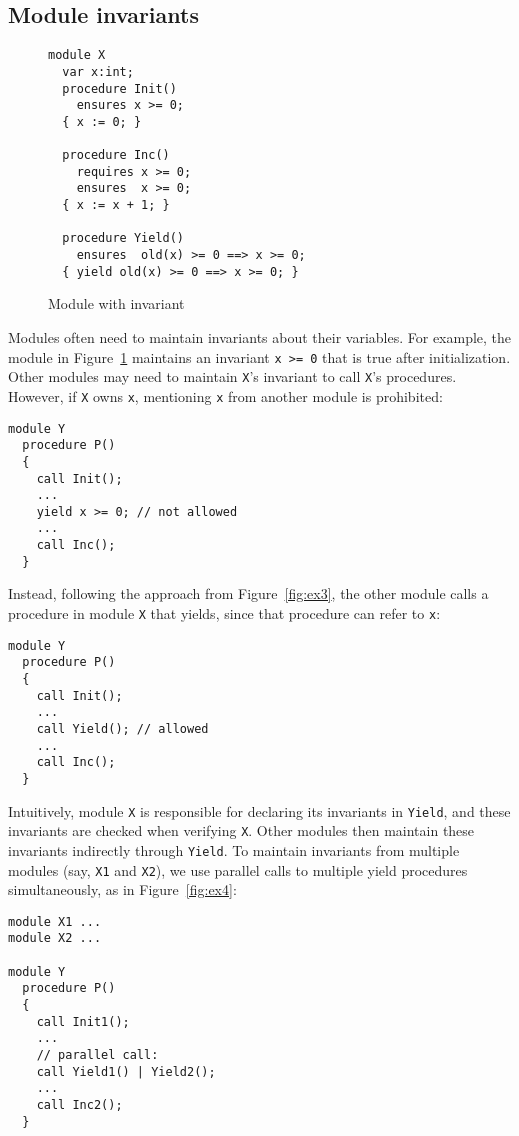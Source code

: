 \subsection{Module invariants}

\begin{figure}
\begin{verbatim}
module X
  var x:int;
  procedure Init()
    ensures x >= 0;
  { x := 0; }

  procedure Inc()
    requires x >= 0;
    ensures  x >= 0;
  { x := x + 1; }

  procedure Yield()
    ensures  old(x) >= 0 ==> x >= 0;
  { yield old(x) >= 0 ==> x >= 0; }
\end{verbatim}
\caption{Module with invariant}
\label{fig:moduleInvariant}
\end{figure}

Modules often need to maintain invariants about their variables.
For example, the module in Figure~\ref{fig:moduleInvariant} maintains an invariant \verb`x >= 0`
that is true after initialization.
Other modules may need to maintain \verb`X`'s invariant to call \verb`X`'s procedures.
However, if \verb`X` owns \verb`x`, mentioning \verb`x` from another module is prohibited:

\begin{verbatim}
module Y
  procedure P()
  {
    call Init();
    ...
    yield x >= 0; // not allowed
    ...
    call Inc();
  }
\end{verbatim}

\noindent
Instead, following the approach from Figure~\ref{fig:ex3},
the other module calls a procedure in module \verb`X` that yields,
since that procedure can refer to \verb`x`:

\begin{verbatim}
module Y
  procedure P()
  {
    call Init();
    ...
    call Yield(); // allowed
    ...
    call Inc();
  }
\end{verbatim}

\noindent
Intuitively, module \verb`X` is responsible for declaring its invariants in \verb`Yield`,
and these invariants are checked when verifying \verb`X`.
Other modules then maintain these invariants indirectly through \verb`Yield`.
To maintain invariants from multiple modules (say, \verb`X1` and \verb`X2`),
we use parallel calls to multiple yield procedures simultaneously,
as in Figure~\ref{fig:ex4}:

\begin{verbatim}
module X1 ...
module X2 ...

module Y
  procedure P()
  {
    call Init1();
    ...
    // parallel call:
    call Yield1() | Yield2();
    ...
    call Inc2();
  }
\end{verbatim}
